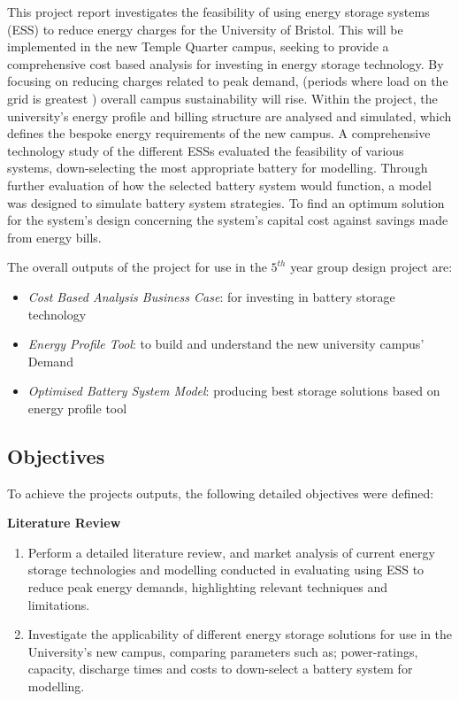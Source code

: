 This project report investigates the feasibility of using energy storage
systems (ESS) to reduce energy charges for the University of Bristol.
This will be implemented in the new Temple Quarter campus, seeking to
provide a comprehensive cost based analysis for investing in energy
storage technology. By focusing on reducing charges related to peak
demand, (periods where load on the grid is greatest
\cite{WhatisPe67:online}) overall campus sustainability will rise.
Within the project, the university's energy profile and billing
structure are analysed and simulated, which defines the bespoke energy
requirements of the new campus. A comprehensive technology study of the
different ESSs evaluated the feasibility of various systems,
down-selecting the most appropriate battery for modelling. Through
further evaluation of how the selected battery system would function, a
model was designed to simulate battery system strategies. To find an
optimum solution for the system's design concerning the system's capital
cost against savings made from energy bills.

The overall outputs of the project for use in the \(5^{th}\) year group
design project are:

\begin{itemize}
\tightlist
\item
  \emph{Cost Based Analysis Business Case}: for investing in battery
  storage technology
\item
  \emph{Energy Profile Tool}: to build and understand the new university
  campus' Demand
\item
  \emph{Optimised Battery System Model}: producing best storage
  solutions based on energy profile tool
\end{itemize}

\subsection{Objectives}\label{objectives}

To achieve the projects outputs, the following detailed objectives were
defined:

\textbf{Literature Review}

\begin{enumerate}
\item Perform a detailed literature review, and market analysis of current energy storage technologies and modelling conducted in evaluating using ESS to reduce peak energy demands, highlighting relevant techniques and limitations.
\item Investigate the applicability of different energy storage solutions for use in the University's new campus, comparing parameters such as; power-ratings, capacity, discharge times and costs to down-select a battery system for modelling.
\end{enumerate}

